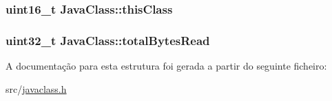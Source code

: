 \subsubsection[{\texorpdfstring{this\+Class}{thisClass}}]{\setlength{\rightskip}{0pt plus 5cm}uint16\+\_\+t Java\+Class\+::this\+Class}\hypertarget{structJavaClass_ac9af41263ddeabcfafd6464fd82c736f}{}\label{structJavaClass_ac9af41263ddeabcfafd6464fd82c736f}
\subsubsection[{\texorpdfstring{total\+Bytes\+Read}{totalBytesRead}}]{\setlength{\rightskip}{0pt plus 5cm}uint32\+\_\+t Java\+Class\+::total\+Bytes\+Read}\hypertarget{structJavaClass_a58b471dbb758d2a3c1bbd6e0e90fb6e2}{}\label{structJavaClass_a58b471dbb758d2a3c1bbd6e0e90fb6e2}


A documentação para esta estrutura foi gerada a partir do seguinte ficheiro\+:\begin{DoxyCompactItemize}
\item 
src/\hyperlink{javaclass_8h}{javaclass.\+h}\end{DoxyCompactItemize}
